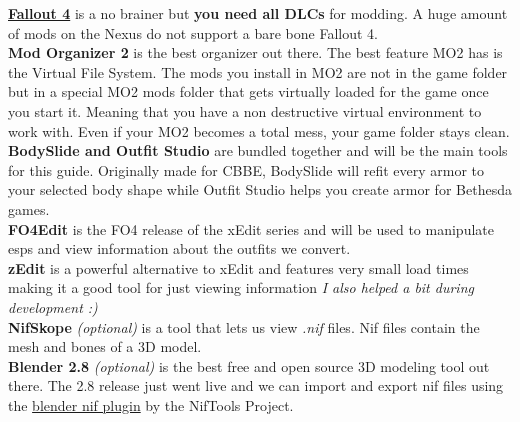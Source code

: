 \begin{flushleft}
    \href{https://www.youtube.com/watch?v=YPN0qhSyWy8}{\textbf{Fallout 4}} is a no brainer but \textbf{you need all DLCs} for modding. A huge amount of
    mods on the Nexus do not support a bare bone Fallout 4.\\
    \vspace{0.1cm}
    \textbf{Mod Organizer 2} is the best organizer out there. The best feature MO2 has is the Virtual File System. The mods you install in MO2 are not in the game folder but in a special 
    MO2 mods folder that gets virtually loaded for the game once you start it. Meaning that you have a non destructive virtual environment to work with.
    Even if your MO2 becomes a total mess, your game folder stays clean.\\
    \vspace{0.1cm}
    \textbf{BodySlide and Outfit Studio} are bundled together and will be the main tools for this guide. Originally made for CBBE, BodySlide will refit 
    every armor to your selected body shape while Outfit Studio helps you create armor for Bethesda games.\\
    \vspace{0.1cm}
    \textbf{FO4Edit} is the FO4 release of the xEdit series and will be used to manipulate esps and view information about the outfits we convert.\\
    \vspace{0.1cm}
    \textbf{zEdit} is a powerful alternative to xEdit and features very small load times making it a good tool for just viewing information \textit{I also helped a bit during development :)}\\
    \vspace{0.1cm}
    \textbf{NifSkope} \textit{(optional)} is a tool that lets us view \textit{.nif} files. Nif files contain the mesh and bones of a 3D model.\\
    \vspace{0.1cm}
    \textbf{Blender 2.8} \textit{(optional)} is the best free and open source 3D modeling tool out there. The 2.8 release just went live and we can import and export nif files using the \href{https://github.com/niftools/blender_nif_plugin}{blender nif plugin} by the NifTools Project.
\end{flushleft}